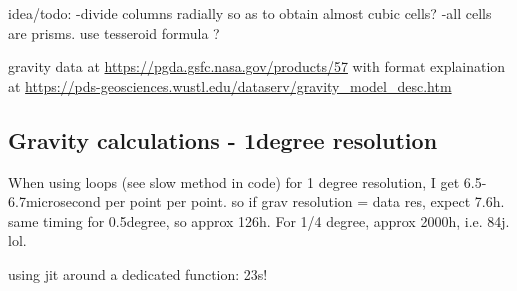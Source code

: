 idea/todo: 
-divide columns radially so as to obtain almost cubic cells?
-all cells are prisms. use tesseroid formula ?


gravity data at \url{https://pgda.gsfc.nasa.gov/products/57}
with format explaination at \url{https://pds-geosciences.wustl.edu/dataserv/gravity_model_desc.htm}

\newpage
\subsection*{Gravity calculations - 1degree resolution}

When using loops (see slow method in code)
for 1 degree resolution, I get 6.5-6.7microsecond per point per point. 
so if grav resolution = data res, expect 7.6h. 
same timing for 0.5degree, so approx 126h.
For 1/4 degree, approx 2000h, i.e. 84j. lol.

using jit around a dedicated function: 23s!

